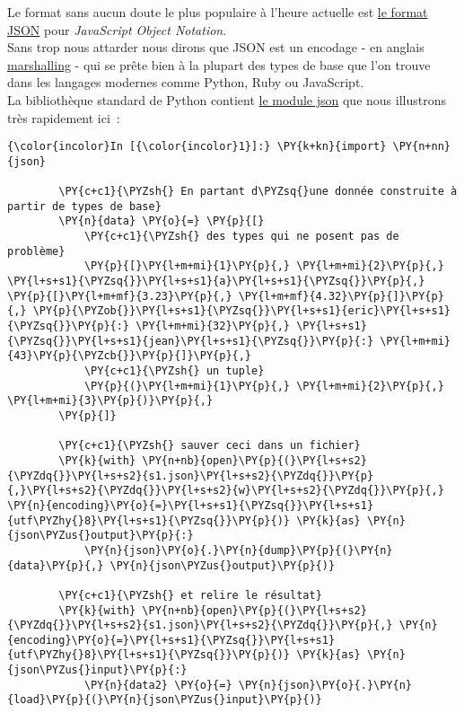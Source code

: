     Le format sans aucun doute le plus populaire à l'heure actuelle est
\href{http://fr.wikipedia.org/wiki/JavaScript_Object_Notation}{le format
JSON} pour \emph{JavaScript Object Notation}.\\

Sans trop nous attarder nous dirons que JSON est un encodage - en
anglais
\href{http://en.wikipedia.org/wiki/Marshalling_\%28computer_science\%29}{marshalling}
- qui se prête bien à la plupart des types de base que l'on trouve dans
les langages modernes comme Python, Ruby ou JavaScript.\\

La bibliothèque standard de Python contient
\href{https://docs.python.org/3/library/json.html}{le module json} que
nous illustrons très rapidement ici~:

    \begin{Verbatim}[commandchars=\\\{\}]
{\color{incolor}In [{\color{incolor}1}]:} \PY{k+kn}{import} \PY{n+nn}{json}
        
        \PY{c+c1}{\PYZsh{} En partant d\PYZsq{}une donnée construite à partir de types de base}
        \PY{n}{data} \PY{o}{=} \PY{p}{[}
            \PY{c+c1}{\PYZsh{} des types qui ne posent pas de problème}
            \PY{p}{[}\PY{l+m+mi}{1}\PY{p}{,} \PY{l+m+mi}{2}\PY{p}{,} \PY{l+s+s1}{\PYZsq{}}\PY{l+s+s1}{a}\PY{l+s+s1}{\PYZsq{}}\PY{p}{,} \PY{p}{[}\PY{l+m+mf}{3.23}\PY{p}{,} \PY{l+m+mf}{4.32}\PY{p}{]}\PY{p}{,} \PY{p}{\PYZob{}}\PY{l+s+s1}{\PYZsq{}}\PY{l+s+s1}{eric}\PY{l+s+s1}{\PYZsq{}}\PY{p}{:} \PY{l+m+mi}{32}\PY{p}{,} \PY{l+s+s1}{\PYZsq{}}\PY{l+s+s1}{jean}\PY{l+s+s1}{\PYZsq{}}\PY{p}{:} \PY{l+m+mi}{43}\PY{p}{\PYZcb{}}\PY{p}{]}\PY{p}{,}
            \PY{c+c1}{\PYZsh{} un tuple}
            \PY{p}{(}\PY{l+m+mi}{1}\PY{p}{,} \PY{l+m+mi}{2}\PY{p}{,} \PY{l+m+mi}{3}\PY{p}{)}\PY{p}{,}
        \PY{p}{]}
        
        \PY{c+c1}{\PYZsh{} sauver ceci dans un fichier}
        \PY{k}{with} \PY{n+nb}{open}\PY{p}{(}\PY{l+s+s2}{\PYZdq{}}\PY{l+s+s2}{s1.json}\PY{l+s+s2}{\PYZdq{}}\PY{p}{,}\PY{l+s+s2}{\PYZdq{}}\PY{l+s+s2}{w}\PY{l+s+s2}{\PYZdq{}}\PY{p}{,} \PY{n}{encoding}\PY{o}{=}\PY{l+s+s1}{\PYZsq{}}\PY{l+s+s1}{utf\PYZhy{}8}\PY{l+s+s1}{\PYZsq{}}\PY{p}{)} \PY{k}{as} \PY{n}{json\PYZus{}output}\PY{p}{:}
            \PY{n}{json}\PY{o}{.}\PY{n}{dump}\PY{p}{(}\PY{n}{data}\PY{p}{,} \PY{n}{json\PYZus{}output}\PY{p}{)}
        
        \PY{c+c1}{\PYZsh{} et relire le résultat}
        \PY{k}{with} \PY{n+nb}{open}\PY{p}{(}\PY{l+s+s2}{\PYZdq{}}\PY{l+s+s2}{s1.json}\PY{l+s+s2}{\PYZdq{}}\PY{p}{,} \PY{n}{encoding}\PY{o}{=}\PY{l+s+s1}{\PYZsq{}}\PY{l+s+s1}{utf\PYZhy{}8}\PY{l+s+s1}{\PYZsq{}}\PY{p}{)} \PY{k}{as} \PY{n}{json\PYZus{}input}\PY{p}{:}
            \PY{n}{data2} \PY{o}{=} \PY{n}{json}\PY{o}{.}\PY{n}{load}\PY{p}{(}\PY{n}{json\PYZus{}input}\PY{p}{)}
\end{Verbatim}


